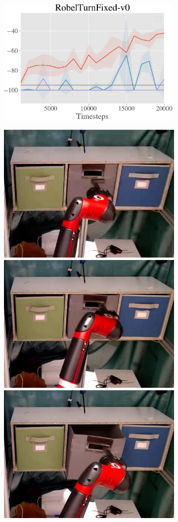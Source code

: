 \begin{figure}[t]
\begin{subfigure}[b]{0.28\textwidth}
        \includegraphics[width=0.99\textwidth]{awac/figures/robot/dclaw_curve-crop.pdf}
    \end{subfigure}
    \begin{subfigure}[b]{0.28\textwidth}
        \center
        
        \includegraphics[height=0.22\linewidth]{awac/figures/filmstrip_drawer/drawer_vid_100.jpg}
        \includegraphics[height=0.22\linewidth]{awac/figures/filmstrip_drawer/drawer_vid_1100.jpg}
        \includegraphics[height=0.22\linewidth]{awac/figures/filmstrip_drawer/drawer_vid_2900.jpg}
        \vspace{0.1cm}


\end{subfigure}
\end{figure}
